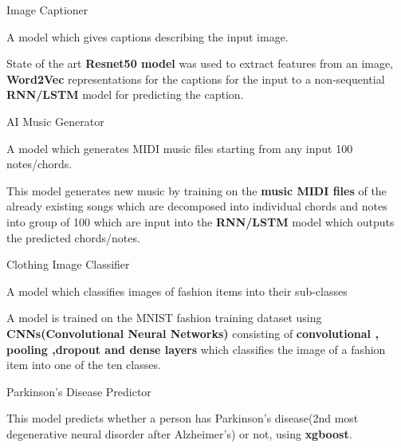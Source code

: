 \begin{cventries}
  \cventry
    {} %
    {Image Captioner } %
    {} %
    {} %
    {
      \begin{cvitems} %
      	\item { A model which gives captions describing the input image.}
    		\item {State of the art \textbf{Resnet50 model} was used to extract features from an image, \textbf{Word2Vec} representations for the captions for the input to  a non-sequential \textbf{RNN/LSTM} model for predicting the caption.
            }
      \end{cvitems}
    }
  \cventry
    {} %
    {AI Music Generator } %
    {} %
    {} %
    {
      \begin{cvitems} %
      	\item { A model which generates MIDI music files starting from any input 100 notes/chords.}
    	\item {This model generates new music by training on the \textbf{music MIDI files} of the already existing songs which are decomposed into individual chords and notes into group of 100 which are input into the \textbf{RNN/LSTM} model which outputs the predicted chords/notes.}
      \end{cvitems}
    }
  \cventry
    {} %
    {Clothing Image Classifier} %
    {} %
    {} %
    {
      \begin{cvitems} %
      	\item { A model which classifies images of fashion items into their sub-classes}
    	\item {A model is trained on the MNIST fashion training dataset using \textbf{CNNs(Convolutional Neural Networks)} consisting of \textbf{convolutional , pooling ,dropout and dense layers} which classifies the image of a fashion item into one of the ten classes. }
      \end{cvitems}
    }
  \cventry
    {} %
    {Parkinson's Disease Predictor} %
    {} %
    {} %
    {
      \begin{cvitems} %
      	\item {This model predicts whether a person has Parkinson's disease(2nd most degenerative neural disorder after Alzheimer's) or not, using \textbf{xgboost}.}
      \end{cvitems}
    }
\end{cventries}